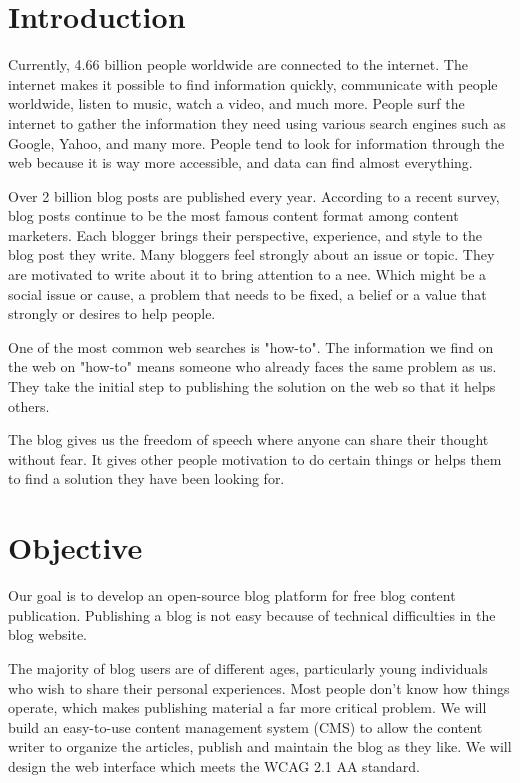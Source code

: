 \documentclass{article}
\begin{document}
\setlength{\parindent}{4em}
\setlength{\parskip}{1em}

\noindent \section{Introduction}

\noindent Currently, 4.66 billion people worldwide are connected to the internet. The internet makes it possible to find information quickly, communicate with people worldwide, listen to music, watch a video, and much more. People surf the internet to gather the information they need using various search engines such as Google, Yahoo, and many more. People tend to look for information through the web because it is way more accessible, and data can find almost everything.

\noindent Over 2 billion blog posts are published every year. According to a recent survey, blog posts continue to be the most famous content format among content marketers. Each blogger brings their perspective, experience, and style to the blog post they write. Many bloggers feel strongly about an issue or topic. They are motivated to write about it to bring attention to a nee. Which might be a social issue or cause, a problem that needs to be fixed, a belief or a value that strongly or desires to help people.

\noindent One of the most common web searches is "how-to". The information we find on the web on "how-to" means someone who already faces the same problem as us. They take the initial step to publishing the solution on the web so that it helps others.

\noindent The blog gives us the freedom of speech where anyone can share their thought without fear. It gives other people motivation to do certain things or helps them to find a solution they have been looking for.

\noindent 

\noindent \section{Objective}

\noindent Our goal is to develop an open-source blog platform for free blog content publication. Publishing a blog is not easy because of technical difficulties in the blog website.

\noindent The majority of blog users are of different ages, particularly young individuals who wish to share their personal experiences. Most people don't know how things operate, which makes publishing material a far more critical problem. We will build an easy-to-use content management system (CMS) to allow the content writer to organize the articles, publish and maintain the blog as they like. We will design the web interface which meets the WCAG 2.1 AA standard.
\end{document}
